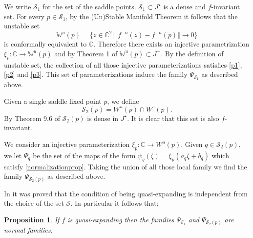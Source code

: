 \documentclass[10pt,a4paper]{article}
\newtheorem{proposition}[theorem]{Proposition}
\newenvironment{example}[1][Example]{\begin{trivlist}
\item[\hskip \labelsep {\bfseries #1}]}{\end{trivlist}}
\begin{document}
\begin{example}[Saddle Points]
We write $\mathcal S_1$ for the set of the saddle points. $\mathcal S_1\subset J^\star$ is  a dense and $f$-invariant set. For every $p\in\mathcal S_1$, by the (Un)Stable Manifold Theorem it follows that the unstable set
\[
\mathbb W^u(p)=\{z\in\mathbb C^2|\,\Vert f^{-n}(z)-f^{-n}(p)\Vert\to 0\}
\]
is conformally equivalent to $\mathbb C$. Therefore there exists an injective parametrization $\xi_p:\mathbb C\rightarrow \mathbb W^u(p)$ and by Theorem 1 of \cite{BS2} $\mathbb W^u(p)\subset J^-$. By the definition of unstable set, the collection of all those injective parameterizations satisfies \eqref{p1}, \eqref{p2} and \eqref{p3}. This set of parameterizations induce the family $\Psi_{\mathcal S_1}$ as described above.
\end{example}
\begin{example}[Recentered Unstable Manifold]Given a single saddle fixed point $p$, we define
$$
\mathcal S_2(p)=W^u(p)\cap W^s(p).
$$
By Theorem 9.6 of \cite{BLS} $\mathcal S_2(p)$ is dense in $J^\star$. It is clear that this set is also $f$-invariant.

We consider an injective parameterization $\xi_{p}:\mathbb C\rightarrow W^u(p)$. Given $q\in\mathcal S_2(p)$, we let $\Psi_q$ be the set of the maps of the form $\psi_q(\zeta)=\xi_{p}(a_q\zeta+b_q)$ which satisfy \eqref{normalizationprop}. Taking the union of all those local family we find the family $\Psi_{\mathcal S_2(p)}$ as described above.
\end{example}

In \cite{BS8} it was proved that the condition of being quasi-expanding is independent from the choice of the set $\mathcal S$. In particular it follows that:

\begin{proposition}
\label{quasiexpsaddlepoint}
If $f$ is quasi-expanding then the families $\Psi_{\mathcal S_1}$ and $\Psi_{\mathcal S_2(p)}$ are normal families.
\end{proposition}
\end{document}

